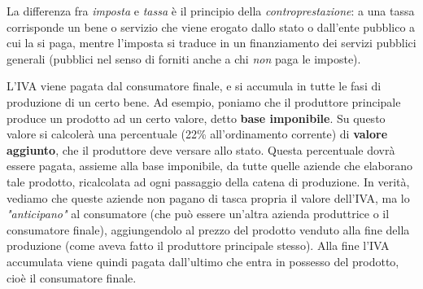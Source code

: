 \documentclass[a4paper,11pt]{article}
\begin{document}
\par\smallskip

La differenza fra \textit{imposta} e \textit{tassa} è il principio della \textit{controprestazione}: a una tassa corrisponde un bene o servizio che viene erogato dallo stato o dall'ente pubblico a cui la si paga, mentre l'imposta si traduce in un finanziamento dei servizi pubblici generali (pubblici nel senso di forniti anche a chi \textit{non} paga le imposte). 

\par\smallskip

L'IVA viene pagata dal consumatore finale, e si accumula in tutte le fasi di produzione di un certo bene.
Ad esempio, poniamo che il produttore principale produce un prodotto ad un certo valore, detto \textbf{base imponibile}.
Su questo valore si calcolerà una percentuale (22\% all'ordinamento corrente) di \textbf{valore aggiunto}, che il produttore deve versare allo stato.
Questa percentuale dovrà essere pagata, assieme alla base imponibile, da tutte quelle aziende che elaborano tale prodotto, ricalcolata ad ogni passaggio della catena di produzione.
In verità, vediamo che queste aziende non pagano di tasca propria il valore dell'IVA, ma lo \textit{"anticipano"} al consumatore (che può essere un'altra azienda produttrice o il consumatore finale), aggiungendolo al prezzo del prodotto venduto alla fine della produzione (come aveva fatto il produttore principale stesso).
Alla fine l'IVA accumulata viene quindi pagata dall'ultimo che entra in possesso del prodotto, cioè il consumatore finale.
\end{document}
